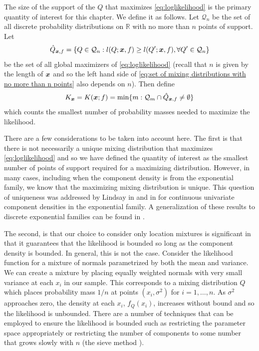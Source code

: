 	The size of the support of the $Q$ that maximizes \eqref{eq:loglikelihood} is the primary quantity of interest for this chapter. We define it as follows. Let $\mathcal{Q}_n$ be the set of all discrete probability distributions on $\mathbb{R}$ with no more than $n$ points of support. Let
	\begin{equation}
		\hat{Q}_{{\bm{{x}}},f} = \{Q \in \mathcal{Q}_n: l(Q;{\bm{{x}}},f) \geq l(Q';{\bm{{x}}},f), \forall Q' \in \mathcal{Q}_n\}
		\label{eq:set of mixing distributions with no more than n points}
	\end{equation}
	be the set of all global maximizers of \eqref{eq:loglikelihood} (recall that $n$ is given by the length of ${\bm{{x}}}$ and so the left hand side of \eqref{eq:set of mixing distributions with no more than n points} also depends on $n$). Then define
	\begin{equation}
		K_{\bm{{x}}} = K({\bm{{x}}}; f) = \min\{m : \mathcal{Q}_m \cap \hat{Q}_{{\bm{{x}}},f} \neq \emptyset\}
		\label{eq:K_x definition}
	\end{equation}
	which counts the smallest number of probability masses needed to maximize the likelihood.


	There are a few considerations to be taken into account here. The first is that there is not necessarily a unique mixing distribution that maximizes \eqref{eq:loglikelihood} and so we have defined the quantity of interest as the smallest number of points of support required for a maximizing distribution. However, in many cases, including when the component density is from the exponential family, we know that the maximizing mixing distribution is unique. This question of uniqueness was addressed by Lindsay in \cite{Lindsay1983-tf} and in \cite{Lindsay1983a-he} for continuous univariate component densities in the exponential family. A generalization of these results to discrete exponential families can be found in \cite{Lindsay1993-rj}.

	The second, is that our choice to consider only location mixtures is significant in that it guarantees that the likelihood is bounded so long as the component density is bounded. In general, this is not the case. Consider the likelihood function for a mixture of normals parametrized by both the mean and variance. We can create a mixture by placing equally weighted normals with very small variance at each $x_i$ in our sample. This corresponds to a mixing distribution $Q$ which places probability mass $1/n$ at points $(x_i, \sigma^2)$ for $i = 1, \dots, n$. As $\sigma^2$ approaches zero, the density at each $x_i$, $f_Q(x_i)$, increases without bound and so the likelihood is unbounded. There are a number of techniques that can be employed to ensure the likelihood is bounded such as restricting the parameter space appropriately or restricting the number of components to some number that grows slowly with $n$ (the sieve method \cite{Grenander1981-dy}).

